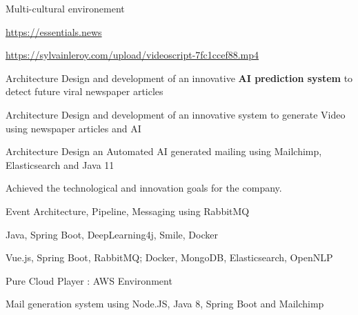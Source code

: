 \begin{cventries}
{{\begin{cvitems}
                    \item{Multi-cultural environement}
                \end{cvitems}
            }
            {
                \begin{cvitems} %
                    \item{\url{https://essentials.news}}
                    \item{\url{https://sylvainleroy.com/upload/videoscript-7fc1ccef88.mp4}}
                    \item{Architecture Design and development of an innovative \textbf{AI prediction system} to detect future viral newspaper articles}
                    \item{Architecture Design and development of an innovative system to generate Video using newspaper articles and AI}
                    \item{Architecture Design an Automated AI generated mailing using Mailchimp, Elasticsearch and Java 11}
                    \item{Achieved the technological and innovation goals for the company.}
                \end{cvitems}
            }
            {
                \begin{cvitems} %
                    \item{Event Architecture, Pipeline, Messaging using RabbitMQ}
                    \item{Java, Spring Boot, DeepLearning4j, Smile, Docker}
                    \item{Vue.js, Spring Boot, RabbitMQ; Docker, MongoDB, Elasticsearch, OpenNLP}
                    \item{Pure Cloud Player : AWS Environment}
                    \item{Mail generation system using Node.JS, Java 8, Spring Boot and Mailchimp}
                \end{cvitems}
            }
        }


\end{cventries}
